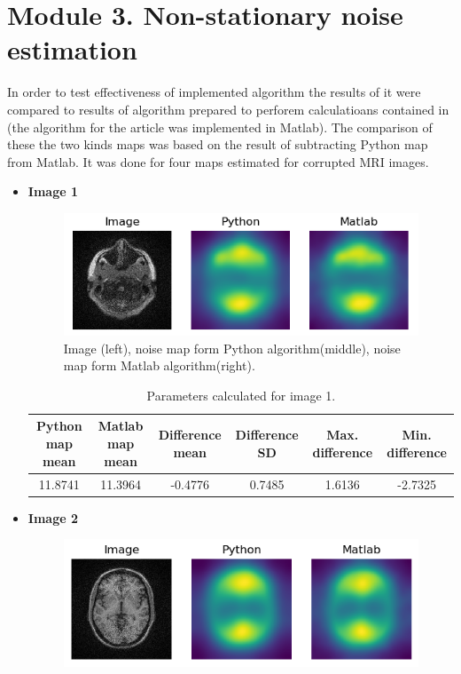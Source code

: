 \section{Module 3. Non-stationary noise estimation}
In order to test effectiveness of implemented algorithm the results of it were compared to results of algorithm prepared to perforem calculatioans contained in \cite{aja2015spatially} (the algorithm for the article was implemented in Matlab). The comparison of these the two kinds maps was based on the result of subtracting Python map from Matlab. It was done for four maps estimated for corrupted MRI images.
\begin{itemize}
\item \textbf{Image 1}
\begin{figure}[H]
	\centering
	\captionsetup{justification=centering}
		\includegraphics[scale=0.7]{figures/module03/10_comp}
		\caption{Image (left), noise map form Python algorithm(middle), noise map form Matlab algorithm(right).}
\end{figure}
\begin{table}[H]
\caption{\label{tab:table-name}Parameters calculated for image 1.}
	\begin{center}
		\begin{tabular}{ |c|c|c|c|c|c| } 
 			\hline
 			\textbf{Python map mean} & \textbf{Matlab map mean} & \textbf{Difference mean} & \textbf{Difference SD} & \textbf{Max. difference} & 					\textbf{Min. difference} \\ 
			\hline
 			11.8741 & 11.3964 & -0.4776 & 0.7485 & 1.6136 & -2.7325 \\ 
			\hline
		\end{tabular}
	\end{center}
\end{table}
\item \textbf{Image 2}
\begin{figure}[H]
	\centering
	\captionsetup{justification=centering}
		\includegraphics[scale=0.7]{figures/module03/70_comp}

\end{figure}
\end{itemize}
